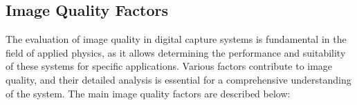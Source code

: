 \subsection{Image Quality Factors}

The evaluation of image quality in digital capture systems is fundamental in the field of applied physics, as it allows determining the performance and suitability of these systems for specific applications. Various factors contribute to image quality, and their detailed analysis is essential for a comprehensive understanding of the system. The main image quality factors are described below:


